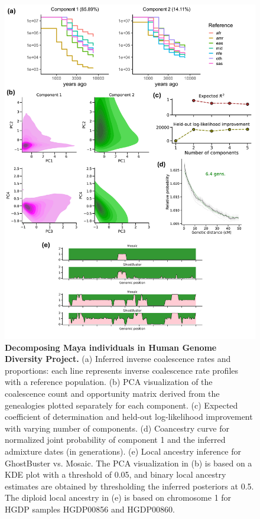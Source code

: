 \begin{figure}[h!]
    \centering
    \includegraphics[width=\linewidth]{figures/gb_sims/gb_real_maya.pdf}
    \captionsetup{width=\textwidth+3cm}     \caption{
    \footnotesize
    \textbf{Decomposing Maya individuals in Human Genome Diversity Project.} (a) Inferred inverse coalescence rates and proportions: each line represents inverse coalescence rate profiles with a reference population. (b) PCA visualization of the coalescence count and opportunity matrix derived from the genealogies plotted separately for each component. (c) Expected coefficient of determination and held-out log-likelihood improvement with varying number of components. (d) Coancestry curve for normalized joint probability of component 1 and the inferred admixture dates (in generations). (e) Local ancestry inference for GhostBuster vs. Mosaic. The PCA visualization in (b) is based on a KDE plot with a threshold of 0.05, and binary local ancestry estimates are obtained by thresholding the inferred posteriors at 0.5. The diploid local ancestry in (e) is based on chromosome 1 for HGDP samples HGDP00856 and HGDP00860.
    }
    \label{fig:gb_maya}
\end{figure}

